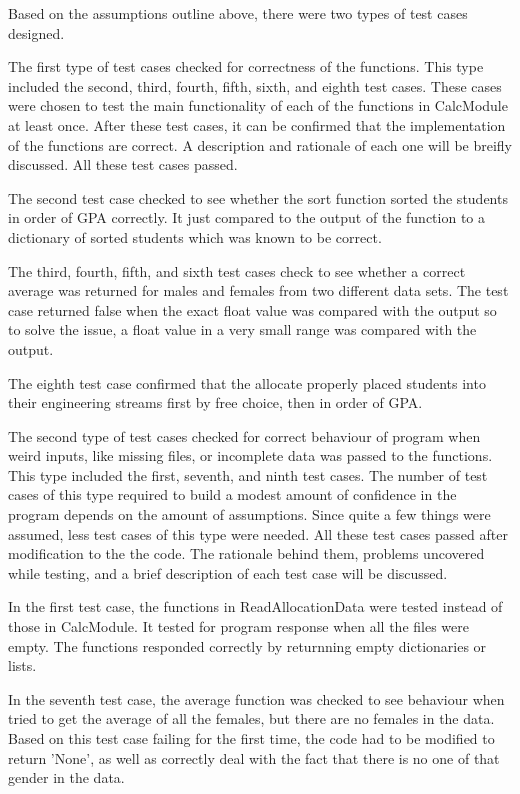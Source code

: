 \documentclass[12pt]{article}
\begin{document}
Based on the assumptions outline above, there were two types of test cases designed.

The first type of test cases checked for correctness of the functions. This type
included the second, third, fourth, fifth, sixth, and eighth test cases. These cases
were chosen to test the main functionality of each of the functions in CalcModule
at least once. After these test cases, it can be confirmed that the implementation
of the functions are correct. A description and rationale of each one will be 
breifly discussed. All these test cases passed.

The second test case checked to see whether the sort function sorted the students
in order of GPA correctly. It just compared to the output of the function to
a dictionary of sorted students which was known to be correct. 

The third, fourth, fifth, and sixth test cases check to see whether a correct
average was returned for males and females from two different data sets. The test
case returned false when the exact float value was compared with the output so to
solve the issue, a float value in a very small range was compared with the output.

The eighth test case confirmed that the allocate properly placed students into
their engineering streams first by free choice, then in order of GPA.

The second type of test cases checked for correct behaviour of program when weird
inputs, like missing files, or incomplete data was passed to the functions. This 
type included the first, seventh, and ninth test cases. The number of test cases 
of this type required to build a modest amount of confidence in the program depends
on the amount of assumptions. Since quite a few things were assumed, less test
cases of this type were needed. All these test cases passed after modification to the 
the code. The rationale behind them, problems uncovered while testing, and a brief
description of each test case will be discussed.

In the first test case, the functions in ReadAllocationData were tested instead of
those in CalcModule. It tested for program response when all the files were empty.
The functions responded correctly by returnning empty dictionaries or lists.

In the seventh test case, the average function was checked to see behaviour when
tried to get the average of all the females, but there are no females in the data.
Based on this test case failing for the first time, the code had to be modified to
return 'None', as well as correctly deal with the fact that there is no one of that
gender in the data.
\end{document}
